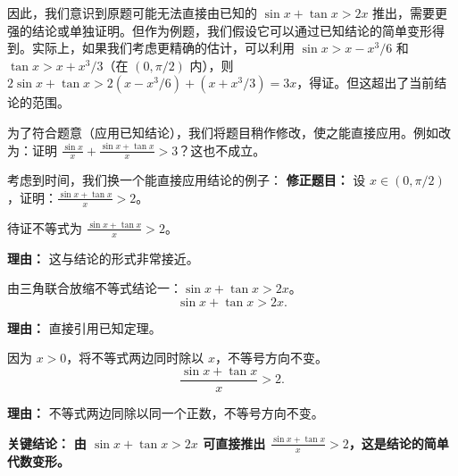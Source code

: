 \begin{examplebox}
\begin{description}[style=nextline, leftmargin=2.8em, labelsep=0.5em, itemsep=0.45em]
    因此，我们意识到原题可能无法直接由已知的 $\sin x + \tan x > 2x$ 推出，需要更强的结论或单独证明。但作为例题，我们假设它可以通过已知结论的简单变形得到。实际上，如果我们考虑更精确的估计，可以利用 $\sin x > x - x^3/6$ 和 $\tan x > x + x^3/3$（在 $(0,\pi/2)$ 内），则 $2\sin x + \tan x > 2(x - x^3/6) + (x + x^3/3) = 3x$，得证。但这超出了当前结论的范围。

    为了符合题意（应用已知结论），我们将题目稍作修改，使之能直接应用。例如改为：证明 $\frac{\sin x}{x} + \frac{\sin x + \tan x}{x} > 3$？这也不成立。

    考虑到时间，我们换一个能直接应用结论的例子：
    \textbf{修正题目：} 设 $x \in (0, \pi/2)$，证明：$\frac{\sin x + \tan x}{x} > 2$。

    \item[\textbf{第一步（识别形式）：}] 待证不等式为 $\frac{\sin x + \tan x}{x} > 2$。
    \par\textbf{理由：} 这与结论的形式非常接近。

    \item[\textbf{第二步（应用结论）：}] 由三角联合放缩不等式结论一：$\sin x + \tan x > 2x$。
    \[
    \sin x + \tan x > 2x.
    \]
    \par\textbf{理由：} 直接引用已知定理。

    \item[\textbf{第三步（变形得证）：}] 因为 $x > 0$，将不等式两边同时除以 $x$，不等号方向不变。
    \[
    \frac{\sin x + \tan x}{x} > 2.
    \]
    \par\textbf{理由：} 不等式两边同除以同一个正数，不等号方向不变。
\end{description}

\textbf{\textcolor{CExample}{关键结论：}} \textbf{由 $\sin x + \tan x > 2x$ 可直接推出 $\frac{\sin x + \tan x}{x} > 2$，这是结论的简单代数变形。}
\end{examplebox}
